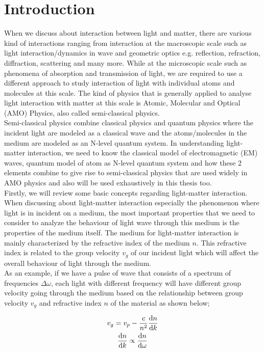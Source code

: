 \chapter{Introduction}
When we discuss about interaction between light and matter, there are various kind of interactions ranging from interaction at the macroscopic scale such as light interaction/dynamics in wave and geometric optics e.g. reflection, refraction, diffraction, scattering and many more. While at the microscopic scale such as phenomena of absorption and transmission of light, we are required to use a different approach to study interaction of light with individual atoms and molecules at this scale. The kind of physics that is generally applied to analyse light interaction with matter at this scale is Atomic, Molecular and Optical (AMO) Physics, also called semi-classical physics.\\

Semi-classical physics combine classical physics and quantum physics where the incident light are modeled as a classical wave and the atoms/molecules in the medium are modeled as an N-level quantum system. In understanding light-matter interaction, we need to know the classical model of electromagnetic (EM) waves, quantum model of atom as N-level quantum system and how these 2 elements combine to give rise to semi-classical physics that are used widely in AMO physics and also will be used exhaustively in this thesis too. \\

Firstly, we will review some basic concepts regarding light-matter interaction. When discussing about light-matter interaction especially the phenomenon where light is in incident on a medium, the most important properties that we need to consider to analyze the behaviour of light wave through this medium is the properties of the medium itself. The medium for light-matter interaction is mainly characterized by the refractive index of the medium $n$. This refractive index is related to the group velocity $v_g$ of our incident light which will affect the overall behaviour of light through the medium.\\

As an example, if we have a pulse of wave that consists of a spectrum of frequencies $\Delta\omega$, each light with different frequency will have different group velocity going through the medium based on the relationship between group velocity $v_g$ and refractive index $n$ of the material as shown below;

\begin{gather}
	v_g = v_p - \frac{c}{n^2} \dv{n}{k}\\
	\dv{n}{k} \propto \dv{n}{\omega}
\end{gather}

